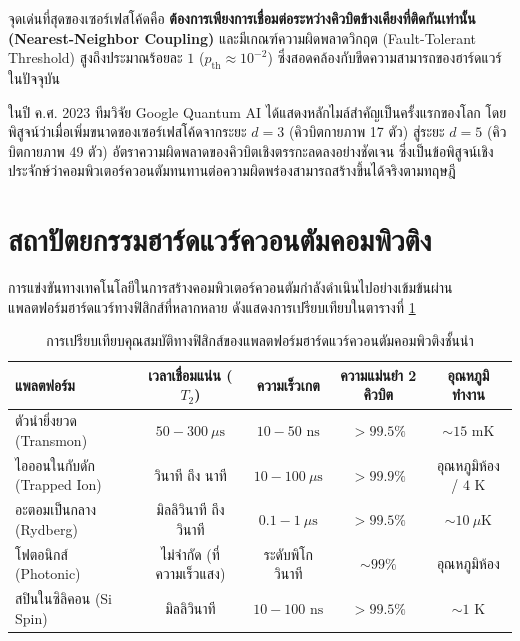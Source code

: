 จุดเด่นที่สุดของเซอร์เฟสโค้ดคือ \textbf{ต้องการเพียงการเชื่อมต่อระหว่างคิวบิตข้างเคียงที่ติดกันเท่านั้น (Nearest-Neighbor Coupling)} และมีเกณฑ์ความผิดพลาดวิกฤต (Fault-Tolerant Threshold) สูงถึงประมาณร้อยละ $1$ ($p_{\text{th}} \approx 10^{-2}$) ซึ่งสอดคล้องกับขีดความสามารถของฮาร์ดแวร์ในปัจจุบัน

ในปี ค.ศ. 2023 ทีมวิจัย Google Quantum AI ได้แสดงหลักไมล์สำคัญเป็นครั้งแรกของโลก โดยพิสูจน์ว่าเมื่อเพิ่มขนาดของเซอร์เฟสโค้ดจากระยะ $d=3$ (คิวบิตกายภาพ 17 ตัว) สู่ระยะ $d=5$ (คิวบิตกายภาพ 49 ตัว) อัตราความผิดพลาดของคิวบิตเชิงตรรกะลดลงอย่างชัดเจน ซึ่งเป็นข้อพิสูจน์เชิงประจักษ์ว่าคอมพิวเตอร์ควอนตัมทนทานต่อความผิดพร่องสามารถสร้างขึ้นได้จริงตามทฤษฎี

\section{สถาปัตยกรรมฮาร์ดแวร์ควอนตัมคอมพิวติง}

การแข่งขันทางเทคโนโลยีในการสร้างคอมพิวเตอร์ควอนตัมกำลังดำเนินไปอย่างเข้มข้นผ่านแพลตฟอร์มฮาร์ดแวร์ทางฟิสิกส์ที่หลากหลาย ดังแสดงการเปรียบเทียบในตารางที่ \ref{tab:quantum_hardware_comparison}

\begin{table}[H]
\centering
\caption{การเปรียบเทียบคุณสมบัติทางฟิสิกส์ของแพลตฟอร์มฮาร์ดแวร์ควอนตัมคอมพิวติงชั้นนำ}
\label{tab:quantum_hardware_comparison}
\begin{tabular}{lcccc}
\toprule
\textbf{แพลตฟอร์ม} & \textbf{เวลาเชื่อมแน่น ($T_2$)} & \textbf{ความเร็วเกต} & \textbf{ความแม่นยำ 2 คิวบิต} & \textbf{อุณหภูมิทำงาน} \\
\midrule
ตัวนำยิ่งยวด (Transmon) & $50 - 300\ \mu\text{s}$ & $10 - 50\text{ ns}$ & $> 99.5\%$ & $\sim 15\text{ mK}$ \\
ไอออนในกับดัก (Trapped Ion) & วินาที ถึง นาที & $10 - 100\ \mu\text{s}$ & $> 99.9\%$ & อุณหภูมิห้อง / $4\text{ K}$ \\
อะตอมเป็นกลาง (Rydberg) & มิลลิวินาที ถึง วินาที & $0.1 - 1\ \mu\text{s}$ & $> 99.5\%$ & $\sim 10\ \mu\text{K}$ \\
โฟตอนิกส์ (Photonic) & ไม่จำกัด (ที่ความเร็วแสง) & ระดับพิโกวินาที & $\sim 99\%$ & อุณหภูมิห้อง \\
สปินในซิลิคอน (Si Spin) & มิลลิวินาที & $10 - 100\text{ ns}$ & $> 99.5\%$ & $\sim 1\text{ K}$ \\
\bottomrule
\end{tabular}
\end{table}

